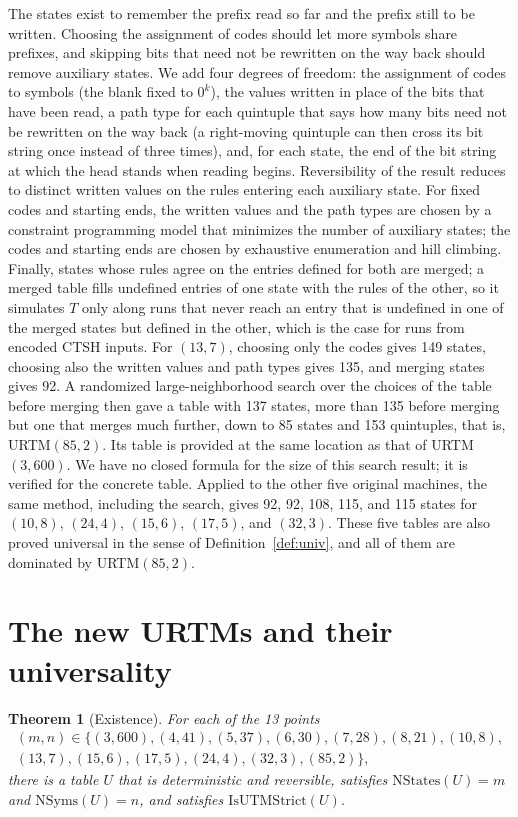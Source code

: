 \documentclass{article}
\newtheorem{theorem}{Theorem}
\theoremstyle{definition}
\theoremstyle{remark}
\begin{document}
The states exist to remember the prefix read so far and the prefix still to be written. Choosing the assignment of codes should let more symbols share prefixes, and skipping bits that need not be rewritten on the way back should remove auxiliary states.
We add four degrees of freedom: the assignment of codes to symbols (the blank fixed to $0^k$), the values written in place of the bits that have been read, a path type for each quintuple that says how many bits need not be rewritten on the way back (a right-moving quintuple can then cross its bit string once instead of three times), and, for each state, the end of the bit string at which the head stands when reading begins.
Reversibility of the result reduces to distinct written values on the rules entering each auxiliary state.
For fixed codes and starting ends, the written values and the path types are chosen by a constraint programming model that minimizes the number of auxiliary states; the codes and starting ends are chosen by exhaustive enumeration and hill climbing.
Finally, states whose rules agree on the entries defined for both are merged; a merged table fills undefined entries of one state with the rules of the other, so it simulates $T$ only along runs that never reach an entry that is undefined in one of the merged states but defined in the other, which is the case for runs from encoded CTSH inputs.
For $(13,7)$, choosing only the codes gives 149 states, choosing also the written values and path types gives 135, and merging states gives 92.
A randomized large-neighborhood search over the choices of the table before merging then gave a table with 137 states, more than 135 before merging but one that merges much further, down to 85 states and 153 quintuples, that is, URTM$(85,2)$. Its table is provided at the same location as that of URTM$(3,600)$.
We have no closed formula for the size of this search result; it is verified for the concrete table.
Applied to the other five original machines, the same method, including the search, gives 92, 92, 108, 115, and 115 states for $(10,8)$, $(24,4)$, $(15,6)$, $(17,5)$, and $(32,3)$.
These five tables are also proved universal in the sense of Definition~\ref{def:univ}, and all of them are dominated by URTM$(85,2)$.

\section{The new URTMs and their universality}
\label{sec:univ}

\begin{theorem}[Existence]
\label{thm:exists}
For each of the 13 points
\begin{multline*}
(m,n)\in\{(3,600),(4,41),(5,37),(6,30),(7,28),(8,21),(10,8),\\(13,7),(15,6),(17,5),(24,4),(32,3),(85,2)\},
\end{multline*}
there is a table $U$ that is deterministic and reversible, satisfies $\mathrm{NStates}(U)=m$ and $\mathrm{NSyms}(U)=n$, and satisfies $\mathrm{IsUTMStrict}(U)$.
\end{theorem}
\end{document}
